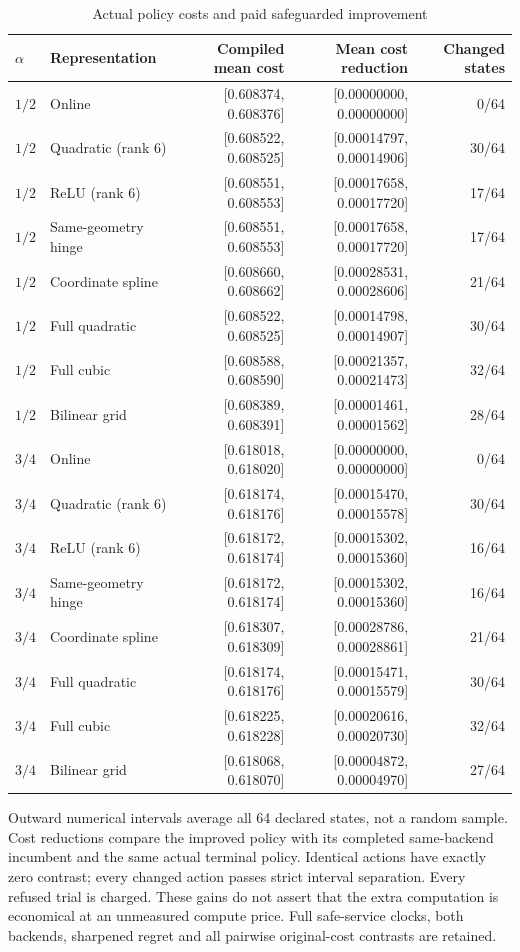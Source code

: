 \begin{table}[htbp]\caption{Actual policy costs and paid safeguarded improvement}\label{tab:economics109}
\centering\scriptsize
\begin{tabular}{@{}llrrr@{}}\toprule
$\alpha$&Representation&Compiled mean cost&Mean cost reduction&Changed states\\\midrule
$1/2$ & Online & [0.608374, 0.608376] & [0.00000000, 0.00000000] & 0/64\\
$1/2$ & Quadratic (rank 6) & [0.608522, 0.608525] & [0.00014797, 0.00014906] & 30/64\\
$1/2$ & ReLU (rank 6) & [0.608551, 0.608553] & [0.00017658, 0.00017720] & 17/64\\
$1/2$ & Same-geometry hinge & [0.608551, 0.608553] & [0.00017658, 0.00017720] & 17/64\\
$1/2$ & Coordinate spline & [0.608660, 0.608662] & [0.00028531, 0.00028606] & 21/64\\
$1/2$ & Full quadratic & [0.608522, 0.608525] & [0.00014798, 0.00014907] & 30/64\\
$1/2$ & Full cubic & [0.608588, 0.608590] & [0.00021357, 0.00021473] & 32/64\\
$1/2$ & Bilinear grid & [0.608389, 0.608391] & [0.00001461, 0.00001562] & 28/64\\
$3/4$ & Online & [0.618018, 0.618020] & [0.00000000, 0.00000000] & 0/64\\
$3/4$ & Quadratic (rank 6) & [0.618174, 0.618176] & [0.00015470, 0.00015578] & 30/64\\
$3/4$ & ReLU (rank 6) & [0.618172, 0.618174] & [0.00015302, 0.00015360] & 16/64\\
$3/4$ & Same-geometry hinge & [0.618172, 0.618174] & [0.00015302, 0.00015360] & 16/64\\
$3/4$ & Coordinate spline & [0.618307, 0.618309] & [0.00028786, 0.00028861] & 21/64\\
$3/4$ & Full quadratic & [0.618174, 0.618176] & [0.00015471, 0.00015579] & 30/64\\
$3/4$ & Full cubic & [0.618225, 0.618228] & [0.00020616, 0.00020730] & 32/64\\
$3/4$ & Bilinear grid & [0.618068, 0.618070] & [0.00004872, 0.00004970] & 27/64\\
\bottomrule\end{tabular}
\par\smallskip\begin{minipage}{.98\linewidth}\footnotesize
Outward numerical intervals average all 64 declared states, not a random sample. Cost reductions compare the improved policy with its completed same-backend incumbent and the same actual terminal policy. Identical actions have exactly zero contrast; every changed action passes strict interval separation. Every refused trial is charged. These gains do not assert that the extra computation is economical at an unmeasured compute price. Full safe-service clocks, both backends, sharpened regret and all pairwise original-cost contrasts are retained.
\end{minipage}\end{table}
